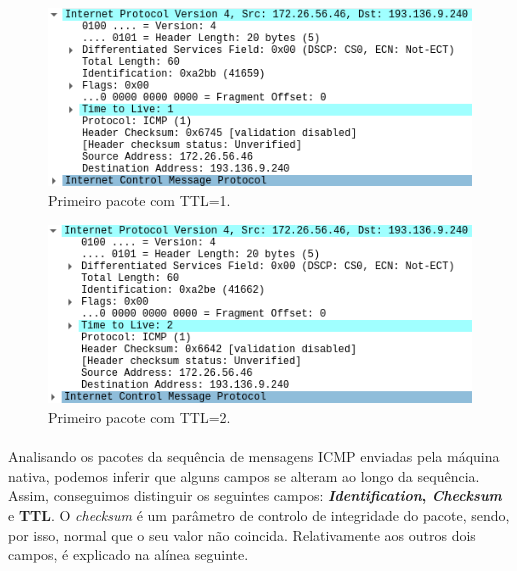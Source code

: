     \begin{minipage}{0.5\linewidth}
    \centering
        \begin{figure}[H]
        \includegraphics[width=0.95\linewidth]{images/ParteI/Questao2/questao2-PrimeiroPacoteCabecalho.png}
        \caption{Primeiro pacote com TTL=1.} \label{questao2-primeiroPacote}
        \end{figure}
    \end{minipage}
    \begin{minipage}{0.5\linewidth}
    \centering
        \begin{figure}[H]
        \includegraphics[width=0.95\linewidth]{images/ParteI/Questao2/questao2-primeiro2TTLCabecalho.png}
        \caption{Primeiro pacote com TTL=2.} \label{questao2-SegundoPacote}
        \end{figure}
    \end{minipage}

    \paragraph{}
    \paragraph{}
    \par Analisando os pacotes da sequência de mensagens ICMP enviadas pela máquina nativa, podemos inferir que alguns campos se alteram ao longo da sequência. Assim, conseguimos distinguir os seguintes campos: \textbf{\textit{Identification}, \textit{Checksum}} e \textbf{TTL}. O \textit{checksum} é um parâmetro de controlo de integridade do pacote, sendo, por isso, normal que o seu valor não coincida. Relativamente aos outros dois campos, é explicado na alínea seguinte.
    


